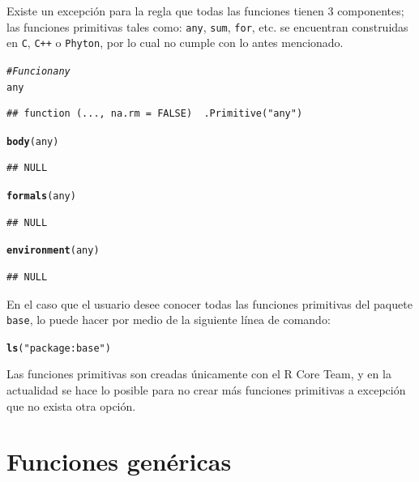\documentclass[11pt,a4paper,oneside]{book}\usepackage[]{graphicx}\usepackage[]{color}
\makeatletter
\newcommand{\hlstr}[1]{\textcolor[rgb]{0.192,0.494,0.8}{#1}}%
\newcommand{\hlcom}[1]{\textcolor[rgb]{0.678,0.584,0.686}{\textit{#1}}}%
\newcommand{\hlstd}[1]{\textcolor[rgb]{0.345,0.345,0.345}{#1}}%
\newcommand{\hlkwd}[1]{\textcolor[rgb]{0.737,0.353,0.396}{\textbf{#1}}}%
\newenvironment{kframe}{%
 \def\at@end@of@kframe{}%
 \ifinner\ifhmode%
  \def\at@end@of@kframe{\end{minipage}}%
  \begin{minipage}{\columnwidth}%
 \fi\fi%
 \def\FrameCommand##1{\hskip\@totalleftmargin \hskip-\fboxsep
 \colorbox{shadecolor}{##1}\hskip-\fboxsep
     \hskip-\linewidth \hskip-\@totalleftmargin \hskip\columnwidth}%
 \MakeFramed {\advance\hsize-\width
   \@totalleftmargin\z@ \linewidth\hsize
   \@setminipage}}%
 {\par\unskip\endMakeFramed%
 \at@end@of@kframe}
\newenvironment{knitrout}{}{} %
\makeatother
\begin{document}
\begin{itemize}
Existe un excepción para la regla que todas las funciones tienen 3 componentes; las funciones primitivas tales como: \texttt{any}, \texttt{sum}, \texttt{for}, etc. se encuentran construidas en \texttt{C}, \texttt{C++} o \texttt{Phyton}, por lo cual no cumple con lo antes mencionado.
\begin{knitrout}
\color{fgcolor}\begin{kframe}
\begin{alltt}
\hlcom{# Funcion any}
\hlstd{any}
\end{alltt}
\begin{verbatim}
## function (..., na.rm = FALSE)  .Primitive("any")
\end{verbatim}
\begin{alltt}
\hlkwd{body}\hlstd{(any)}
\end{alltt}
\begin{verbatim}
## NULL
\end{verbatim}
\begin{alltt}
\hlkwd{formals}\hlstd{(any)}
\end{alltt}
\begin{verbatim}
## NULL
\end{verbatim}
\begin{alltt}
\hlkwd{environment}\hlstd{(any)}
\end{alltt}
\begin{verbatim}
## NULL
\end{verbatim}
\end{kframe}
\end{knitrout}

En el caso que el usuario desee conocer todas las funciones primitivas del paquete \texttt{base}, lo puede hacer por medio de la siguiente línea de comando:
\begin{knitrout}
\color{fgcolor}\begin{kframe}
\begin{alltt}
\hlkwd{ls}\hlstd{(}\hlstr{"package:base"}\hlstd{)}
\end{alltt}
\end{kframe}
\end{knitrout}

Las funciones primitivas son creadas únicamente con el R Core Team, y en la actualidad se hace lo posible para no crear más funciones primitivas a excepción que no exista otra opción.

\section{Funciones genéricas}


\end{itemize}
\end{document}
